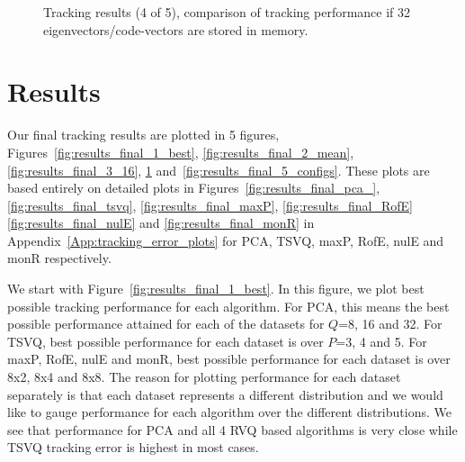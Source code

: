 								\begin{figure}[t]
								\centering
								
								\caption{Tracking results (4 of 5), comparison of tracking performance if 32 eigenvectors/code-vectors are stored in memory.}
								\label{fig:results_final_4_32}
								\end{figure}

\section{Results}
Our final tracking results are plotted in 5 figures, Figures~\ref{fig:results_final_1_best}, \ref{fig:results_final_2_mean}, \ref{fig:results_final_3_16}, \ref{fig:results_final_4_32} and~\ref{fig:results_final_5_configs}.  These plots are based entirely on detailed plots in Figures~\ref{fig:results_final_pca_}, \ref{fig:results_final_tsvq}, \ref{fig:results_final_maxP}, \ref{fig:results_final_RofE} \ref{fig:results_final_nulE} and \ref{fig:results_final_monR} in Appendix~\ref{App:tracking_error_plots} for PCA, TSVQ, maxP, RofE, nulE and monR respectively.

We start with Figure~\ref{fig:results_final_1_best}.  In this figure, we plot best possible tracking performance for each algorithm.  For PCA, this means the best possible performance attained for each of the datasets for $Q$=8, 16 and 32.  For TSVQ, best possible performance for each dataset is over $P$=3, 4 and 5.  For maxP, RofE, nulE and monR, best possible performance for each dataset is over 8x2, 8x4 and 8x8.  The reason for plotting performance for each dataset separately is that each dataset represents a different distribution and we would like to gauge performance for each algorithm over the different distributions.  We see that performance for PCA and all 4 RVQ based algorithms is very close while TSVQ tracking error is highest in most cases.  

